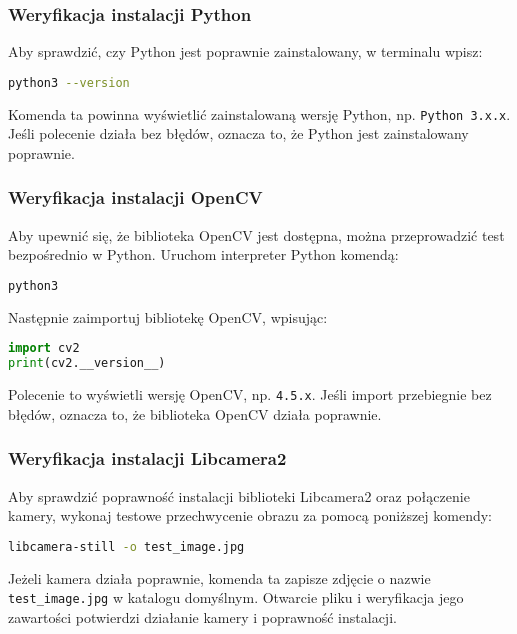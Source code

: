 \subsubsection{Weryfikacja instalacji Python}
Aby sprawdzić, czy Python jest poprawnie zainstalowany, w terminalu wpisz:

\begin{lstlisting}[language=bash]
python3 --version
\end{lstlisting}

Komenda ta powinna wyświetlić zainstalowaną wersję Python, np. \texttt{Python 3.x.x}. Jeśli polecenie działa bez błędów, oznacza to, że Python jest zainstalowany poprawnie.

\subsubsection{Weryfikacja instalacji OpenCV}
Aby upewnić się, że biblioteka OpenCV jest dostępna, można przeprowadzić test bezpośrednio w Python. Uruchom interpreter Python komendą:

\begin{lstlisting}[language=bash]
python3
\end{lstlisting}

Następnie zaimportuj bibliotekę OpenCV, wpisując:

\begin{lstlisting}[language=Python]
import cv2
print(cv2.__version__)
\end{lstlisting}

Polecenie to wyświetli wersję OpenCV, np. \texttt{4.5.x}. Jeśli import przebiegnie bez błędów, oznacza to, że biblioteka OpenCV działa poprawnie.

\subsubsection{Weryfikacja instalacji Libcamera2}
Aby sprawdzić poprawność instalacji biblioteki Libcamera2 oraz połączenie kamery, wykonaj testowe przechwycenie obrazu za pomocą poniższej komendy:

\begin{lstlisting}[language=bash]
libcamera-still -o test_image.jpg
\end{lstlisting}

Jeżeli kamera działa poprawnie, komenda ta zapisze zdjęcie o nazwie \texttt{test\_image.jpg} w katalogu domyślnym. Otwarcie pliku i weryfikacja jego zawartości potwierdzi działanie kamery i poprawność instalacji.

